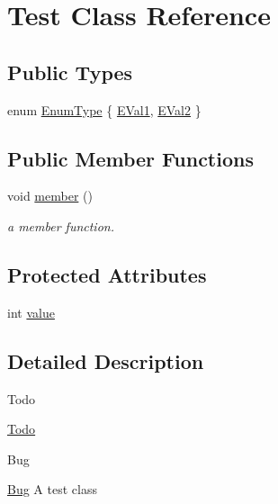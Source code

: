 \hypertarget{classTest}{\section{Test Class Reference}
\label{classTest}
}
\subsection*{Public Types}
\begin{DoxyCompactItemize}
\item 
enum \hyperlink{classTest_a26bf93efdaea3c6e2cfa4119c3755d3f}{Enum\+Type} \{ \hyperlink{classTest_a26bf93efdaea3c6e2cfa4119c3755d3faacfab1e4105c05a2e503931a0e82b5b0}{E\+Val1}, 
\hyperlink{classTest_a26bf93efdaea3c6e2cfa4119c3755d3fae2fa04fb1c4db1f7d72b8781ba19ffcc}{E\+Val2}
 \}
\end{DoxyCompactItemize}
\subsection*{Public Member Functions}
\begin{DoxyCompactItemize}
\item 
\hypertarget{classTest_ad86c7affdfb5ca8e720f44ef56169c50}{void \hyperlink{classTest_ad86c7affdfb5ca8e720f44ef56169c50}{member} ()}\label{classTest_ad86c7affdfb5ca8e720f44ef56169c50}

\begin{DoxyCompactList}\small\item\em a member function. \end{DoxyCompactList}\end{DoxyCompactItemize}
\subsection*{Protected Attributes}
\begin{DoxyCompactItemize}
\item 
int \hyperlink{classTest_ad55002283eba8ffa062dfb849f6c077c}{value}
\end{DoxyCompactItemize}


\subsection{Detailed Description}
\begin{DoxyRefDesc}{Todo}
\item[\hyperlink{todo__todo000001}{Todo}]\end{DoxyRefDesc}
\begin{DoxyRefDesc}{Bug}
\item[\hyperlink{bug__bug000001}{Bug}]A test class \end{DoxyRefDesc}


